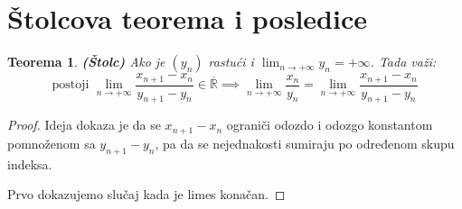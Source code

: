 \documentclass[a4paper,12pt]{article}
\theoremstyle{plain}
\newtheorem{theorem}{Teorema}[section]
\theoremstyle{definition}
\theoremstyle{remark}
\begin{document}
\section{Štolcova teorema i posledice}
\begin{theorem}
    \textbf{(Štolc)} Ako je $(y_n)$ rastući i $\displaystyle \lim_{n \to + \infty} y_n = +\infty$. Tada važi:
    \[ \text{postoji } \lim_{n \to +\infty} \frac{x_{n+1} - x_n}{y_{n+1} - y_n} \in \overline{\mathbb{R}} \implies \lim_{n \to +\infty} \frac{x_n}{y_n} = \lim_{n \to +\infty} \frac{x_{n+1} - x_n}{y_{n+1} - y_n}\]
\end{theorem}
\begin{proof}
Ideja dokaza je da se $x_{n+1} - x_n$ ograniči odozdo i odozgo konstantom pomnoženom sa $y_{n+1} - y_n$, pa da se nejednakosti sumiraju po određenom skupu indeksa.

Prvo dokazujemo slučaj kada je limes konačan.


\end{proof}
\end{document}
